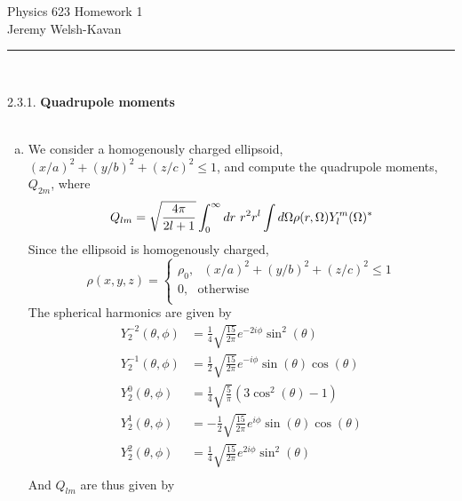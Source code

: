 \documentclass[]{article}
\begin{document}
{\Large Physics 623 Homework 1}\\
{Jeremy Welsh-Kavan}\\
\vspace{0.2 cm}
\begin{center}
\noindent\rule{15cm}{0.4pt} \\
\end{center}
2.3.1. {\bf Quadrupole moments} \\
\\
\begin{enumerate}[c)]
\item We consider a homogenously charged ellipsoid, $(x/a)^2 + (y/b)^2 + (z/c)^2 \leq 1$, and compute the quadrupole moments, $Q_{2m}$, where
\begin{equation}
Q_{lm} = \sqrt{ \frac{4\pi}{2l+1}} \int_{0}^{\infty}dr \text{ } r^2 r^l \int d\Omega \rho(r,\Omega)Y_{l}^{m}(\Omega)^* \\
\end{equation}
Since the ellipsoid is homogenously charged, 
\begin{equation}
\rho(x,y,z) = \begin{cases}
\rho_0, \text{ } (x/a)^2 + (y/b)^2 + (z/c)^2 \leq 1 \\
0, \text{ } \text{otherwise} \\
\end{cases}
\end{equation}
The spherical harmonics are given by
\begin{equation}
\begin{split}
Y_{2}^{-2}(\theta,\phi) & =  \frac{1}{4} \sqrt{\frac{15}{2 \pi }} e^{-2 i \phi } \sin ^2(\theta ) \\
Y_{2}^{-1}(\theta,\phi) & =  \frac{1}{2} \sqrt{\frac{15}{2 \pi }} e^{-i \phi } \sin (\theta ) \cos (\theta )\\
Y_{2}^{0}(\theta,\phi) & = \frac{1}{4} \sqrt{\frac{5}{\pi }} \left(3 \cos ^2(\theta )-1\right) \\
Y_{2}^{1}(\theta,\phi) & =  -\frac{1}{2} \sqrt{\frac{15}{2 \pi }} e^{i \phi } \sin (\theta ) \cos (\theta ) \\
Y_{2}^{2}(\theta,\phi) & = \frac{1}{4} \sqrt{\frac{15}{2 \pi }} e^{2 i \phi } \sin ^2(\theta ) \\
\end{split}
\end{equation}
And $Q_{lm}$ are thus given by
\begin{equation}

\end{equation}
\end{enumerate}
\end{document}
